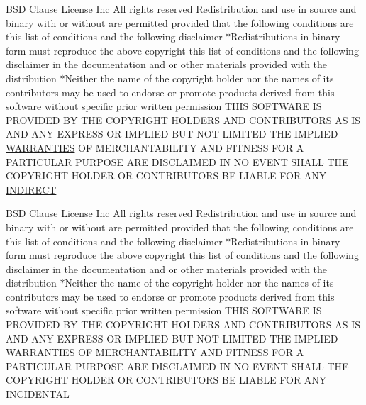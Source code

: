 \begin{DoxyCompactItemize}
B\+SD Clause License Inc All rights reserved Redistribution and use in source and binary with or without are permitted provided that the following conditions are this list of conditions and the following disclaimer $\ast$Redistributions in binary form must reproduce the above copyright this list of conditions and the following disclaimer in the documentation and or other materials provided with the distribution $\ast$Neither the name of the copyright holder nor the names of its contributors may be used to endorse or promote products derived from this software without specific prior written permission T\+H\+IS S\+O\+F\+T\+W\+A\+RE IS P\+R\+O\+V\+I\+D\+ED BY T\+HE C\+O\+P\+Y\+R\+I\+G\+HT H\+O\+L\+D\+E\+RS A\+ND C\+O\+N\+T\+R\+I\+B\+U\+T\+O\+RS AS IS A\+ND A\+NY E\+X\+P\+R\+E\+SS OR I\+M\+P\+L\+I\+ED B\+UT N\+OT L\+I\+M\+I\+T\+ED T\+HE I\+M\+P\+L\+I\+ED \hyperlink{LICENSE_8txt_a8472295fc7dc3e152751655a351cab17}{W\+A\+R\+R\+A\+N\+T\+I\+ES} OF M\+E\+R\+C\+H\+A\+N\+T\+A\+B\+I\+L\+I\+TY A\+ND F\+I\+T\+N\+E\+SS F\+OR A P\+A\+R\+T\+I\+C\+U\+L\+AR P\+U\+R\+P\+O\+SE A\+RE D\+I\+S\+C\+L\+A\+I\+M\+ED IN NO E\+V\+E\+NT S\+H\+A\+LL T\+HE C\+O\+P\+Y\+R\+I\+G\+HT H\+O\+L\+D\+ER OR C\+O\+N\+T\+R\+I\+B\+U\+T\+O\+RS BE L\+I\+A\+B\+LE F\+OR A\+NY \hyperlink{LICENSE_8txt_ad848f8b0223259d90a9efbe70f847522}{I\+N\+D\+I\+R\+E\+CT}
\item 
B\+SD Clause License Inc All rights reserved Redistribution and use in source and binary with or without are permitted provided that the following conditions are this list of conditions and the following disclaimer $\ast$Redistributions in binary form must reproduce the above copyright this list of conditions and the following disclaimer in the documentation and or other materials provided with the distribution $\ast$Neither the name of the copyright holder nor the names of its contributors may be used to endorse or promote products derived from this software without specific prior written permission T\+H\+IS S\+O\+F\+T\+W\+A\+RE IS P\+R\+O\+V\+I\+D\+ED BY T\+HE C\+O\+P\+Y\+R\+I\+G\+HT H\+O\+L\+D\+E\+RS A\+ND C\+O\+N\+T\+R\+I\+B\+U\+T\+O\+RS AS IS A\+ND A\+NY E\+X\+P\+R\+E\+SS OR I\+M\+P\+L\+I\+ED B\+UT N\+OT L\+I\+M\+I\+T\+ED T\+HE I\+M\+P\+L\+I\+ED \hyperlink{LICENSE_8txt_a8472295fc7dc3e152751655a351cab17}{W\+A\+R\+R\+A\+N\+T\+I\+ES} OF M\+E\+R\+C\+H\+A\+N\+T\+A\+B\+I\+L\+I\+TY A\+ND F\+I\+T\+N\+E\+SS F\+OR A P\+A\+R\+T\+I\+C\+U\+L\+AR P\+U\+R\+P\+O\+SE A\+RE D\+I\+S\+C\+L\+A\+I\+M\+ED IN NO E\+V\+E\+NT S\+H\+A\+LL T\+HE C\+O\+P\+Y\+R\+I\+G\+HT H\+O\+L\+D\+ER OR C\+O\+N\+T\+R\+I\+B\+U\+T\+O\+RS BE L\+I\+A\+B\+LE F\+OR A\+NY \hyperlink{LICENSE_8txt_a7f76bd8e64b92352ebc9702da9b2286d}{I\+N\+C\+I\+D\+E\+N\+T\+AL}

\end{DoxyCompactItemize}
